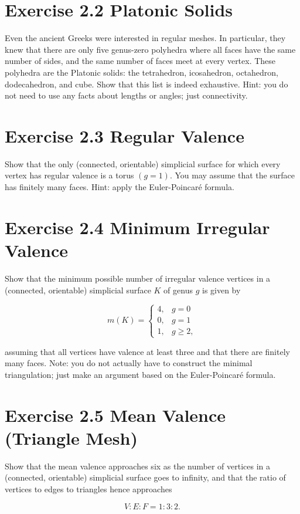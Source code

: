 \documentclass[10pt]{article}
\begin{document}
\section*{Exercise 2.2 Platonic Solids}
Even the ancient Greeks were interested in regular meshes. In particular, they knew that there are only five genus-zero polyhedra where all faces have the same number of sides, and the same number of faces meet at every vertex. These polyhedra are the Platonic solids: the tetrahedron, icosahedron, octahedron, dodecahedron, and cube. Show that this list is indeed exhaustive. Hint: you do not need to use any facts about lengths or angles; just connectivity.

\section*{Exercise 2.3 Regular Valence}
Show that the only (connected, orientable) simplicial surface for which every vertex has regular valence is a torus $(g=1)$. You may assume that the surface has finitely many faces. Hint: apply the Euler-Poincaré formula.

\section*{Exercise 2.4 Minimum Irregular Valence}
Show that the minimum possible number of irregular valence vertices in a (connected, orientable) simplicial surface $K$ of genus $g$ is given by

$$
m(K)= \begin{cases}4, & g=0 \\ 0, & g=1 \\ 1, & g \geq 2,\end{cases}
$$

assuming that all vertices have valence at least three and that there are finitely many faces. Note: you do not actually have to construct the minimal triangulation; just make an argument based on the Euler-Poincaré formula.

\section*{Exercise 2.5 Mean Valence (Triangle Mesh)}
Show that the mean valence approaches six as the number of vertices in a (connected, orientable) simplicial surface goes to infinity, and that the ratio of vertices to edges to triangles hence approaches

$$
V: E: F=1: 3: 2 .
$$
\end{document}
